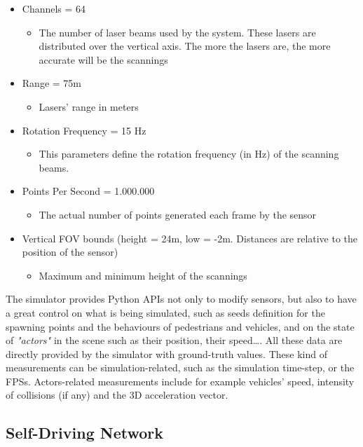 \begin{itemize}
	\item Channels = 64
	\begin{itemize}
		\item The number of laser beams used by the system. These lasers are distributed over the vertical axis. The more the lasers are, the more accurate will be the scannings
	\end{itemize}
	\item Range = 75m
	\begin{itemize}
		\item Lasers' range in meters
	\end{itemize}
	\item Rotation Frequency = 15 Hz
	\begin{itemize}
		\item This parameters define the rotation frequency (in Hz) of the scanning beams.
	\end{itemize}
	\item Points Per Second = 1.000.000
	\begin{itemize}
		\item The actual number of points generated each frame by the sensor
	\end{itemize}
	\item Vertical FOV bounds (height = 24m, low = -2m. Distances are relative to the position of the sensor)
	\begin{itemize}
		\item Maximum and minimum height of the scannings
	\end{itemize}
\end{itemize}

The simulator provides Python APIs not only to modify sensors, but also to have a great control on what is being simulated, such as seeds definition for the spawning points and the behaviours of pedestrians and vehicles, and on the state of \textsl{"actors"} in the scene such as their position, their speed\dots. All these data are directly provided by the simulator with ground-truth values. These kind of measurements can be simulation-related, such as the simulation time-step, or the FPSs. Actors-related measurements include for example vehicles' speed, intensity of collisions (if any) and the 3D acceleration vector.

\subsection{Self-Driving Network}

